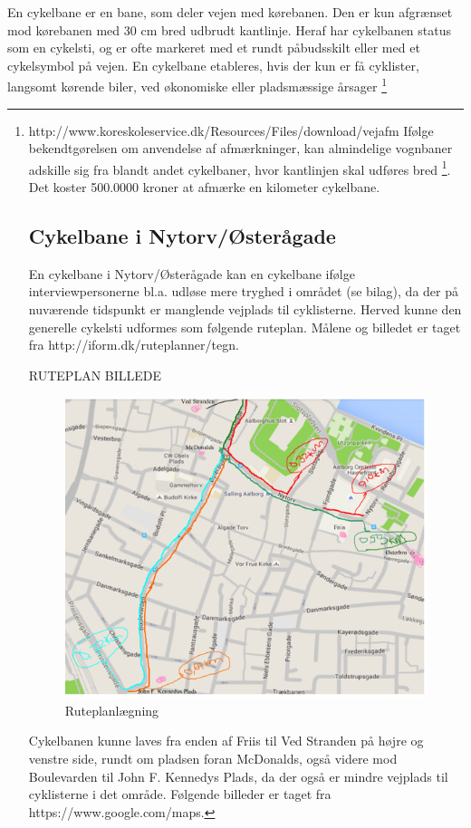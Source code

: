 En cykelbane er en bane, som deler vejen med kørebanen. Den er kun afgrænset mod kørebanen med 30 cm bred udbrudt kantlinje. Heraf har cykelbanen status som en cykelsti, og er ofte markeret med et rundt påbudsskilt eller med et cykelsymbol på vejen. En cykelbane etableres, hvis der kun er få cyklister, langsomt kørende biler, ved økonomiske eller pladsmæssige årsager \footnote{http://www.koreskoleservice.dk/Resources/Files/download/vejafm%
  Ifølge bekendtgørelsen om anvendelse af afmærkninger, kan almindelige vognbaner adskille sig fra blandt andet cykelbaner, hvor kantlinjen skal udføres bred \footnote{http://pvr.as/cykelstier-i-kobenhavn/ 03/12-2015}.  Det koster 500.0000 kroner at afmærke en kilometer cykelbane.

\subsection{Cykelbane i Nytorv/Østerågade}
En cykelbane i Nytorv/Østerågade kan en cykelbane ifølge interviewpersonerne bl.a. udløse mere tryghed i området (se bilag), da der på nuværende tidspunkt er manglende vejplads til cyklisterne. Herved kunne den generelle cykelsti udformes som følgende ruteplan. Målene og billedet er taget fra http://iform.dk/ruteplanner/tegn.

RUTEPLAN BILLEDE
\begin{figure}[htbp]
   \label{fig:Ruteplan}
   \centering
   \begin{adjustbox}{max width=\textwidth}
     \includegraphics[scale=0.5]{billederogfigur/ruteplanlaegning.png}
  \end{adjustbox}
   \caption{Ruteplanlægning}
 \end{figure}
Cykelbanen kunne laves fra enden af Friis til Ved Stranden på højre og venstre side, rundt om pladsen foran McDonalds, også videre mod Boulevarden til John F. Kennedys Plads, da der også er mindre vejplads til cyklisterne i det område. Følgende billeder er taget fra https://www.google.com/maps.

}
